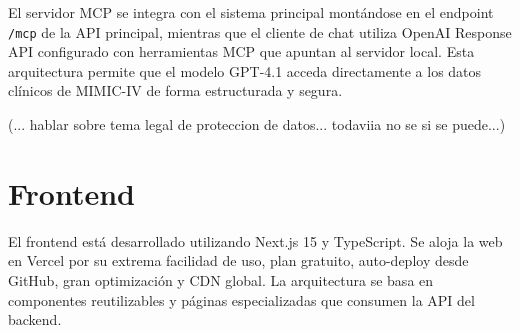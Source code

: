 El servidor MCP se integra con el sistema principal montándose en el endpoint \texttt{/mcp} de la API principal, mientras que el cliente de chat utiliza OpenAI Response API configurado con herramientas MCP que apuntan al servidor local. Esta arquitectura permite que el modelo GPT-4.1 acceda directamente a los datos clínicos de MIMIC-IV de forma estructurada y segura.








(... hablar sobre tema legal de proteccion de datos... todaviia no se si se puede...)


\section{Frontend}

El frontend está desarrollado utilizando Next.js 15 y TypeScript. Se aloja la web en Vercel por su extrema facilidad de uso, plan gratuito, auto-deploy desde GitHub, gran optimización y CDN global. La arquitectura se basa en componentes reutilizables y páginas especializadas que consumen la API del backend.

